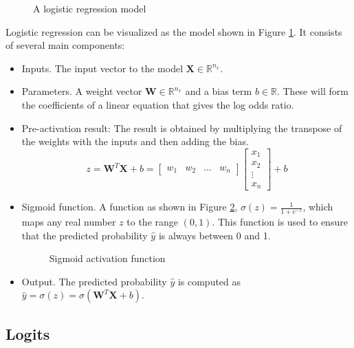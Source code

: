 \documentclass[conference]{IEEEtran}
\begin{document}
	\begin{figure}[H]
		\centering
		
		\caption{A logistic regression model}
		\label{fig:logisticregression}
	\end{figure}

	
	Logistic regression can be visualized as the model shown in Figure \ref{fig:logisticregression}. It consists of several main components:
	
	\begin{itemize}[]
		\item Inputs. The input vector to the model $\textbf{X} \in \mathbb{R}^{n_x}$.

		\item Parameters. A weight vector $\textbf{W} \in \mathbb{R}^{n_x}$ and a bias term $b \in \mathbb{R}$.  These will form the coefficients of a linear equation that gives the log odds ratio.

		\item Pre-activation result: The result is obtained by multiplying the transpose of the weights with the inputs and then adding the bias. 
		$$z= \textbf{W}^{T}\textbf{X} + b = \begin{bmatrix} w_1 & w_2 & \dots & w_n\end{bmatrix}\begin{bmatrix} x_1\\ x_2 \\ \vdots \\x_n\end{bmatrix} + b$$
		
	
		\item Sigmoid function. A function as shown in Figure \ref{fig:sigmoid}, $\sigma(z) = \frac{1}{1 + e^{-z}}$, which maps any real number $z$ to the range $(0,1)$. This function is used to ensure that the predicted probability $\hat{y}$ is always between 0 and 1.
		\begin{figure}
			\centering
			
			\caption{Sigmoid activation function}
			\label{fig:sigmoid}
		\end{figure}

		\item Output. The predicted probability $\hat{y}$ is computed as $\hat{y} = \sigma(z) = \sigma(\textbf{W}^{T}\textbf{X} + b)$.
	\end{itemize}
	
	
	\subsection{Logits}
		
\end{document}
